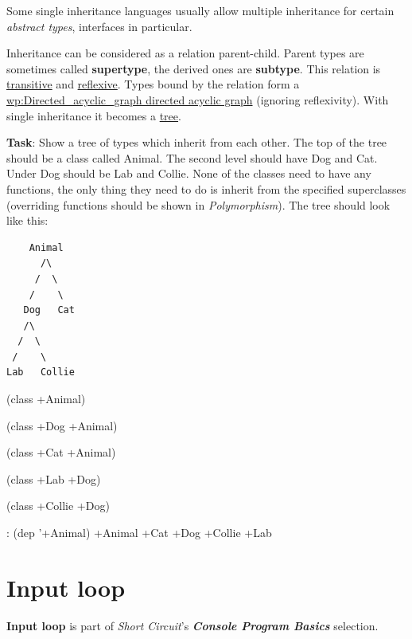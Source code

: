 Some single inheritance languages usually allow multiple inheritance for
certain \emph{abstract types}, interfaces in
particular.

Inheritance can be considered as a relation parent-child. Parent types
are sometimes called \textbf{supertype}, the derived ones are
\textbf{subtype}. This relation is
\href{http://en.wikipedia.org/wiki/Transitive\_relation}{transitive} and
\href{http://en.wikipedia.org/wiki/Reflexive\_relation}{reflexive}.
Types bound by the relation form a
\href{http://en.wikipedia.org/wiki/Directed\_acyclic\_graph\_directed\_acyclic\_graph}{wp:Directed\_acyclic\_graph
directed acyclic graph} (ignoring reflexivity). With single inheritance
it becomes a
\href{http://en.wikipedia.org/wiki/Tree\_(graph\_theory)}{tree}.

\pagebreak{}

\textbf{Task}: Show a tree of types which inherit from each other. The
top of the tree should be a class called Animal. The second level should
have Dog and Cat. Under Dog should be Lab and Collie. None of the
classes need to have any functions, the only thing they need to do is
inherit from the specified superclasses (overriding functions should be
shown in \emph{Polymorphism}). The tree should look
like this:


\begin{verbatim}
    Animal
      /\
     /  \
    /    \
   Dog   Cat
   /\
  /  \
 /    \
Lab   Collie
\end{verbatim}



\begin{wideverbatim}

(class +Animal)

(class +Dog +Animal)

(class +Cat +Animal)

(class +Lab +Dog)

(class +Collie +Dog)

: (dep '+Animal)
+Animal
   +Cat
   +Dog
      +Collie
      +Lab

\end{wideverbatim}

\pagebreak{}
\section*{Input loop}

\textbf{Input loop} is part of \emph{Short Circuit}'s
\textbf{\emph{Console Program Basics}} selection.

